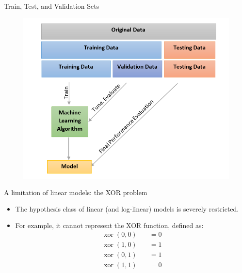 \documentclass[handout]{beamer}
\begin{document}
\begin{frame}{Train, Test, and Validation Sets}
\begin{scriptsize}

 \begin{figure}[htb]
	\centering
	 \includegraphics[scale=0.55]{pics/validation.png}
\end{figure}


\end{scriptsize}
\end{frame}


\begin{frame}{A limitation of linear models: the XOR problem}
\begin{scriptsize}
\begin{itemize}
\item The hypothesis class of linear (and log-linear) models is severely restricted.
\item For example, it cannot represent the XOR function, defined as:
\begin{equation}
 \begin{split}
  \operatorname{xor}(0,0) \quad & = 0 \\
  \operatorname{xor}(1,0) \quad & = 1 \\
  \operatorname{xor}(0,1) \quad & = 1 \\
  \operatorname{xor}(1,1) \quad & = 0 \\
 \end{split}
\end{equation}
\end{itemize}
\end{scriptsize}
\end{frame}
\end{document}
